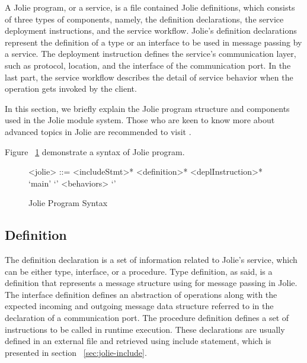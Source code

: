 A Jolie program, or a service, is a file contained Jolie definitions, which consists of three types of components, namely, the definition declarations, the service deployment instructions, and the service workflow. Jolie's definition declarations represent the definition of a type or an interface to be used in message passing by a service. The deployment instruction defines the service's communication layer, such as protocol, location, and the interface of the communication port. In the last part, the service workflow describes the detail of service behavior when the operation gets invoked by the client.

In this section, we briefly explain the Jolie program structure and components used in the Jolie module system. Those who are keen to know more about advanced topics in Jolie are recommended to visit \cite{joliedoc, JOLIE}.

Figure ~\ref{fig:JolieGrammar} demonstrate a syntax of Jolie program.

\begin{figure}[h]
    \begin{framed}
        \begin{grammar}
            <jolie> ::= <includeStmt>* <definition>* <deplInstruction>*  `main' `{' <behaviors> `}'
        \end{grammar}
    \end{framed}
    \caption{Jolie Program Syntax}
    \label{fig:JolieGrammar}
\end{figure}

\FloatBarrier

\subsection{Definition}
\label{sec:jolie-def}

The definition declaration is a set of information related to Jolie's service, which can be either type, interface, or a procedure. Type definition, as said, is a definition that represents a message structure using for message passing in Jolie. The interface definition defines an abstraction of operations along with the expected incoming and outgoing message data structure referred to in the declaration of a communication port. The procedure definition defines a set of instructions to be called in runtime execution. These declarations are usually defined in an external file and retrieved using include statement, which is presented in section ~\ref{sec:jolie-include}.

